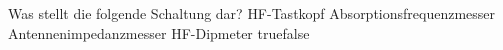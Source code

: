     {Was stellt die folgende Schaltung dar? }
    {HF-Tastkopf}
    {Absorptionsfrequenzmesser}
    {Antennenimpedanzmesser}
    {HF-Dipmeter}
    {true}{false}